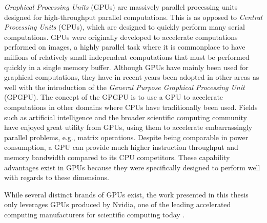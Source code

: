 \textit{Graphical Processing Units} (GPUs) are massively parallel processing units designed for high-throughput parallel computations.
This is as opposed to \textit{Central Processing Units} (CPUs), which are designed to quickly perform many serial computations.
GPUs were originally developed to accelerate computations performed on images, a highly parallel task where it is commonplace to have millions of relatively small independent computations that must be performed quickly in a single memory buffer.
Although GPUs have mainly been used for graphical computations, they have in recent years been adopted in other areas as well with the introduction of the \textit{General Purpose Graphical Processing Unit} (GPGPU).
The concept of the GPGPU is to use a GPU to accelerate computations in other domains where CPUs have traditionally been used.
Fields such as artificial intelligence and the broader scientific computing community have enjoyed great utility from GPUs, using them to accelerate embarrassingly parallel problems, e.g., matrix operations.
Despite being comparable in power consumption, a GPU can provide much higher instruction throughput and memory bandwidth compared to its CPU competitors.
These capability advantages exist in GPUs because they were specifically designed to perform well with regards to these dimensions.


While several distinct brands of GPUs exist, the work presented in this thesis only leverages GPUs produced by Nvidia, one of the leading accelerated computing manufacturers for scientific computing today \cite{gpu_marketshare}.
